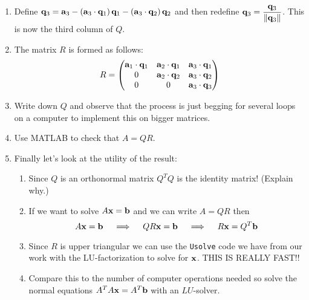 \begin{problem}
\begin{enumerate}
        \item Define ${\bf q}_3 = \displaystyle {\bf a}_3 - \left( {\bf a}_3 \cdot {\bf q}_1 \right){\bf q}_1
            - \left( {\bf a}_3 \cdot {\bf q}_2 \right){\bf q}_2$ and then redefine $\displaystyle
            {\bf q}_3 = \frac{{\bf q}_3}{\|{\bf q}_3\|}$.  This is now the third column of
            $Q$.\\
        \item The matrix $R$ is formed as follows:
            \[ R = \begin{pmatrix} {\bf a}_1 \cdot {\bf q}_1 & {\bf a}_2 \cdot {\bf q}_1 & {\bf a}_3 \cdot
                    {\bf q}_1 \\ 0 & {\bf a}_2 \cdot {\bf q}_2 & {\bf a}_3 \cdot {\bf q}_2 \\ 0 & 0 & {\bf a}_3
                    \cdot {\bf q}_3 \end{pmatrix} \]
        \item Write down $Q$ and observe that the process is just begging for several
            loops on a computer to implement this on bigger matrices.
        \item Use MATLAB to check that $A = QR$.
        \item Finally let's look at the utility of the result:
            \begin{enumerate}
                \item Since $Q$ is an orthonormal matrix $Q^TQ$ is the identity matrix!
                    (Explain why.)
                \item If we want to solve $A{\bf x} = {\bf b}$ and we can write $A = QR$ then 
                    \[ A {\bf x} = {\bf b} \quad \implies \quad QR {\bf x} = {\bf b} \quad \implies \quad
                        R {\bf x} = Q^T {\bf b} \]
                \item Since $R$ is upper triangular we can use the \texttt{Usolve} code we
                    have from our work with the LU-factorization to solve for ${\bf x}$.  THIS
                    IS REALLY FAST!!
                \item Compare this to the number of computer operations needed so solve
                    the normal equations $A^TA{\bf x} = A^T {\bf b}$ with an $LU$-solver.
            \end{enumerate}
    \end{enumerate}
\end{problem}

